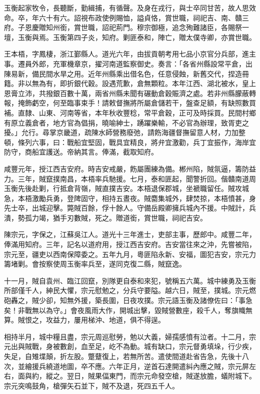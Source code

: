 \begin{pinyinscope}
玉衡起家牧令，長聽斷，勤緝捕，有循聲。及身在戎行，與士卒同甘苦，故人思效命。卒，年六十有六。詔視布政使例賜恤，謚貞恪，賞世職，祠祀吉、南、贛三府。子恩慶贈知州銜，賞世職，詔祀荊門。穆宗御極，追念殉難諸臣，各賜祭一壇，玉衡與焉。玉衡第四子炎，知府。剿匪泰和，陣亡，贈太僕寺卿，亦賞世職。

王本梧，字鳳棲，浙江鄞縣人。道光六年，由拔貢朝考用七品小京官分兵部，進主事。遷員外郎，充軍機章京，擢河南道監察御史。奏言：「各省州縣設常平倉，出陳易新，備民間水旱之用。近年州縣乘出借名色，任意侵蝕，新舊交代，捏造冊籍。非以無為有，即折銀代穀。設遇荒歉，倉無顆粒。本年江西、湖北被水，皇上恩膏立沛，共撥銀百數十萬，兩省州縣未聞有碾動倉穀賑濟之處。若非州縣朦蔽轉報，掩飾虧空，何至臨事束手！請敕督撫將所屬倉儲若干，盤查足額，有缺照數買補。直隸、山東、河南等省，本年秋收豐稔，常平倉穀，正可及時採買。民間村鄉有原立義倉者，地方官為倡捐，曉喻紳士，踴躍樂輸，不必官為辦理，致胥吏之擾。」允行。尋掌京畿道，疏陳水師營務廢弛，請飭海疆督撫留意人材，力加整頓，條列六事，曰：戰船宜堅固，戰具宜精良，將弁宜激勸，兵丁宜振作，海岸宜防守，商船宜護送。帝納其言。俸滿，截取知府。

咸豐元年，授江西吉安府。時吉安戒嚴，飭屬團練為備。郴州陷，賊氛逼，籌防益力。三年，賊竄撲南昌，本梧率兵馳援。七月，泰和匪起，聞警折回。偕贛南道周玉衡先後赴剿，行抵倉背嶺，賊直撲吉安。本梧退保郡城，坐褫職留任。賊攻城急，本梧激勵兵勇，登陴固守，相持五晝夜。賊麕集城外，肆焚掠，本梧憤甚，身先士卒，出城迎擊。斃賊百餘，俘十餘人。守備岳殿卿擁兵城內不援。中賊計，兵潰，勢孤力竭，猶手刃數賊，死之。贈道銜，賞世職，祠祀吉安。

陳宗元，字保之，江蘇吳江人。道光十三年進士，吏部主事，歷郎中。咸豐二年，俸滿用知府。三年，記名以道府用，授江西吉安府。吉安當往來之沖，先嘗被陷，宗元至，疆吏以西南保障委之。五年九月，粵匪陷永新、安福，圖犯吉安，宗元力籌堵剿。會按察使周玉衡率兵至，遂同克復二縣，賊竄逸。

十一月，賊自袁州、臨江回竄，別隊更自泰和來犯，號稱五六萬。城中練勇及玉衡所部僅千人，紳民大懼，宗元慰勉之，分兵守要隘。越六日，賊至，撲城。宗元燃砲轟之，賊少卻，知無外援，築長圍，日夜攻撲。宗元語玉衡及諸僚佐曰：「事急矣！非戰無以為守。」會夜風雨大作，開城出擊，毀賊營數座，殺千人，奪旗幟無算。賊恨之，攻益力，屢用梯沖、地道，俱不得逞。

相持半月，城中糧且盡，宗元周巡慰勞，勉以大義，婦孺感憤有泣者。十二月，宗元出與賊戰，身被數創，血至足，屹不為動。城有缺口，宗元督勇填垛，行少疾，失足，自雉堞顛，折左股。蹩躠復上，若無所苦。遣使間道赴省告急，先後十八次，並繪援兵繞道地圖，卒不應。六年正月，逆首石達開遣糾內應之賊，宗元屏左右，面與約，縱之。翌日，賊果偪東門，而宗元命發空槍，賊遂放膽，蟻附城下。宗元突鳴鼓角，槍彈矢石並下，賊不及退，死四五千人。


\end{pinyinscope}
